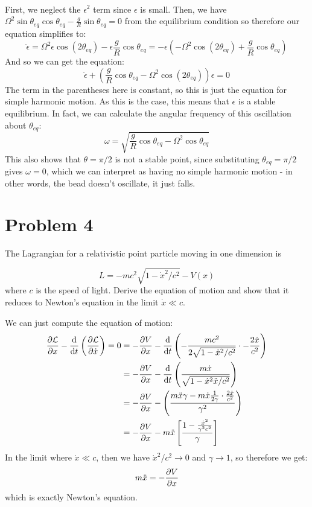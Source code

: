 \documentclass[10pt]{article}
\begin{document}
\begin{enumerate}[label=(\alph*)]
\begin{solution}
\begin{align*}
            \end{align*}
            First, we neglect the $\epsilon^2$ term since $\epsilon$ is small. Then, we have $\Omega^2 \sin \theta_{eq} \cos \theta_{eq} - \frac gR \sin \theta_{eq} = 0$ from the equilibrium condition so therefore our equation simplifies to:
            \[ \ddot \epsilon = \Omega^2 \epsilon \cos(2\theta_{eq}) - \epsilon \frac gR \cos \theta_{eq} = -\epsilon\left( -\Omega^2 \cos(2\theta_{eq}) + \frac gR \cos \theta_{eq}\right)\]
            And so we can get the equation: 
            \[ \ddot \epsilon + \left( \frac gR \cos \theta_{eq} - \Omega^2 \cos (2\theta_{eq})\right)\epsilon = 0\]
            The term in the parentheses here is constant, so this is just the equation for simple harmonic motion. As this is the case, this means that $\epsilon$ is a stable equilibrium. In fact, we can calculate the angular frequency of this oscillation about $\theta_{eq}$: 
            \[ \omega = \sqrt{\frac gR \cos \theta_{eq} - \Omega^2 \cos \theta_{eq}}\]
            This also shows that $\theta = \pi/2$ is not a stable point, since substituting $\theta_{eq} = \pi/2$ gives $\omega =0$, which we can interpret as having no simple harmonic motion - in other words, the bead doesn't oscillate, it just falls.
        \end{solution}
    \end{enumerate}

    \pagebreak
    \section*{Problem 4}

    The Lagrangian for a relativistic point particle moving in one dimension is

    \[ L = -mc^2 \sqrt{1 - \dot x^2/c^2} - V(x)\] 
    where $c$ is the speed of light. Derive the equation of motion and show that it reduces to Newton's equation in the limit $\dot x \ll c$.
    
    \begin{solution}
        We can just compute the equation of motion:
        \begin{align*}
            \pdv{\mathcal L}{x} - \dv{t} \left( \pdv{\mathcal L}{\dot x}\right) = 0 &= -\pdv{V}{x} - \dv{t}\left( -\frac{mc^2}{2\sqrt{1 - \dot x^2/c^2}} \cdot -\frac{2\dot x}{c^2}\right)\\
            &= -\pdv{V}{x} - \dv{t}\left( \frac{m\dot x}{\sqrt{1 - \dot x^2 \ddot x/c^2}}\right)\\
            &= -\pdv{V}{x} - \left( \frac{m \ddot x \gamma - m\dot x \frac{1}{2\gamma} \cdot \frac{2\dot x}{c^2}}{\gamma^2}\right)\\
            &= -\pdv{V}{x} - m\ddot x\left[ \frac{1 - \frac{\dot x^2}{\gamma^2 c^2}}{\gamma}\right]
        \end{align*}
        In the limit where $\dot x \ll c$, then we have $\dot x^2/c^2 \to 0$ and $\gamma \to 1$, so therefore we get:
        \[ m \ddot x = -\pdv{V}{x}\] 
        which is exactly Newton's equation. 
    \end{solution}
\end{document}
